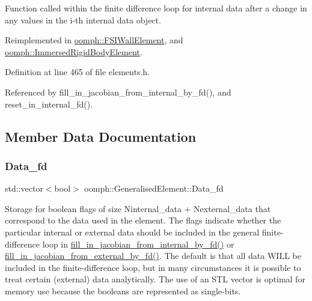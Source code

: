 Function called within the finite difference loop for internal data after a change in any values in the i-\/th internal data object. 



Reimplemented in \hyperlink{classoomph_1_1FSIWallElement_ae3b3a1cbaa1b9f467a25f41307135873}{oomph\+::\+F\+S\+I\+Wall\+Element}, and \hyperlink{classoomph_1_1ImmersedRigidBodyElement_a96a991a1b99ff591bebe076772fc99c3}{oomph\+::\+Immersed\+Rigid\+Body\+Element}.



Definition at line 465 of file elements.\+h.



Referenced by fill\+\_\+in\+\_\+jacobian\+\_\+from\+\_\+internal\+\_\+by\+\_\+fd(), and reset\+\_\+in\+\_\+internal\+\_\+fd().



\subsection{Member Data Documentation}
\mbox{\label{classoomph_1_1GeneralisedElement_ad9478b11629bf0a082f7e273c6c872fa}} 
\subsubsection{\texorpdfstring{Data\+\_\+fd}{Data\_fd}}
{\footnotesize\ttfamily std\+::vector$<$bool$>$ oomph\+::\+Generalised\+Element\+::\+Data\+\_\+fd\hspace{0.3cm}{\ttfamily [private]}}



Storage for boolean flags of size Ninternal\+\_\+data + Nexternal\+\_\+data that correspond to the data used in the element. The flags indicate whether the particular internal or external data should be included in the general finite-\/difference loop in \hyperlink{classoomph_1_1GeneralisedElement_a3409d6da14739827766547c7338360e3}{fill\+\_\+in\+\_\+jacobian\+\_\+from\+\_\+internal\+\_\+by\+\_\+fd()} or \hyperlink{classoomph_1_1GeneralisedElement_a01ccf0a6a959cff46a36a4b7f1cf1554}{fill\+\_\+in\+\_\+jacobian\+\_\+from\+\_\+external\+\_\+by\+\_\+fd()}. The default is that all data W\+I\+LL be included in the finite-\/difference loop, but in many circumstances it is possible to treat certain (external) data analytically. The use of an S\+TL vector is optimal for memory use because the booleans are represented as single-\/bits. 



